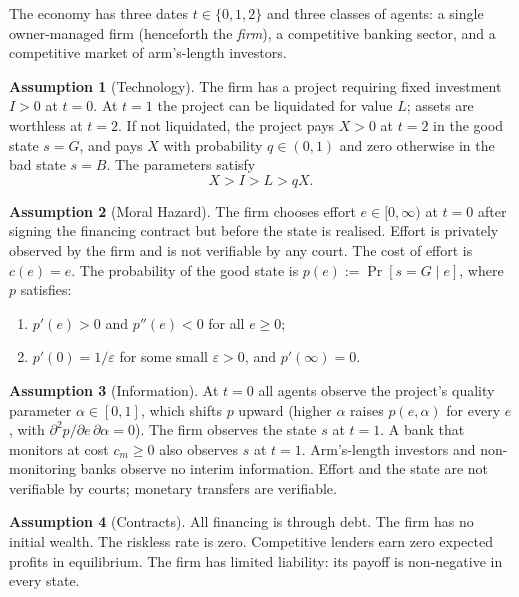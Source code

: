 \documentclass[12pt,a4paper]{article}
\theoremstyle{plain}
\theoremstyle{definition}
\newtheorem{assumption}{Assumption}
\theoremstyle{remark}
\begin{document}
The economy has three dates $t \in \{0,1,2\}$ and three classes of agents: a single owner-managed firm (henceforth the \emph{firm}), a competitive banking sector, and a competitive market of arm's-length investors.

\begin{assumption}[Technology]
\label{a:technology}
The firm has a project requiring fixed investment $I > 0$ at $t = 0$. At $t = 1$ the project can be liquidated for value $L$; assets are worthless at $t = 2$. If not liquidated, the project pays $X > 0$ at $t = 2$ in the good state $s = G$, and pays $X$ with probability $q \in (0,1)$ and zero otherwise in the bad state $s = B$. The parameters satisfy
\begin{equation}
\label{eq:param}
X > I > L > qX.
\end{equation}
\end{assumption}

\begin{assumption}[Moral Hazard]
\label{a:moral-hazard}
The firm chooses effort $e \in [0,\infty)$ at $t = 0$ after signing the financing contract but before the state is realised. Effort is privately observed by the firm and is not verifiable by any court. The cost of effort is $c(e) = e$. The probability of the good state is $p(e) := \Pr[s = G \mid e]$, where $p$ satisfies:
\begin{enumerate}[nosep,label=(\roman*)]
\item $p'(e) > 0$ and $p''(e) < 0$ for all $e \geq 0$;
\item $p'(0) = 1/\varepsilon$ for some small $\varepsilon > 0$, and $p'(\infty) = 0$.
\end{enumerate}
\end{assumption}

\begin{assumption}[Information]
\label{a:information}
At $t = 0$ all agents observe the project's quality parameter $\alpha \in [0,1]$, which shifts $p$ upward (higher $\alpha$ raises $p(e,\alpha)$ for every $e$, with $\partial^2 p / \partial e \, \partial \alpha = 0$). The firm observes the state $s$ at $t = 1$. A bank that monitors at cost $c_m \geq 0$ also observes $s$ at $t = 1$. Arm's-length investors and non-monitoring banks observe no interim information. Effort and the state are not verifiable by courts; monetary transfers are verifiable.
\end{assumption}

\begin{assumption}[Contracts]
\label{a:contracts}
All financing is through debt. The firm has no initial wealth. The riskless rate is zero. Competitive lenders earn zero expected profits in equilibrium. The firm has limited liability: its payoff is non-negative in every state.
\end{assumption}
\end{document}
